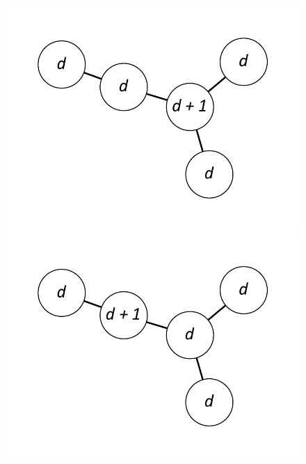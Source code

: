 \documentclass[12pt]{article}
\theoremstyle{plain}
\theoremstyle{definition}
\theoremstyle{remark}
\begin{document}
		
\begin{figure}[!htb]
\centering
\includegraphics[scale=0.25]{Superabundance/MaxDegree3Trees/0011001010[2,1,1,1,4].pdf}
\includegraphics[scale=0.25]{Superabundance/MaxDegree3Trees/0011001010[3,1,1,1,3].pdf}

\end{figure}
\end{document}
